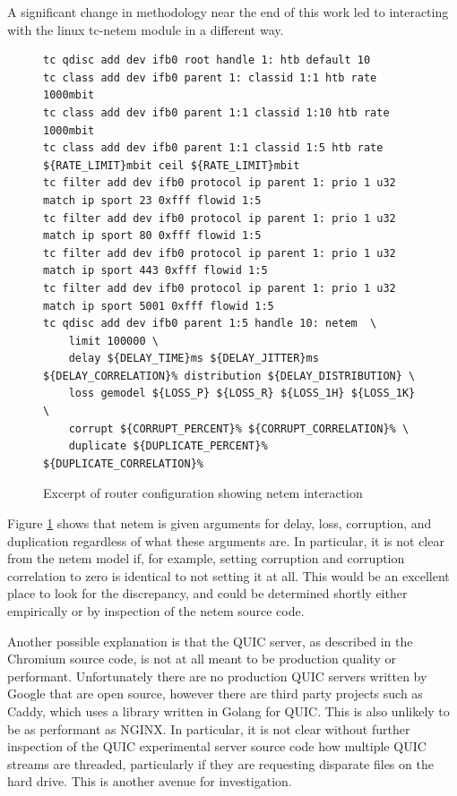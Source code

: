 \documentclass[12pt]{article}
\begin{document}
A significant change in methodology near the end of this work led to interacting with the linux tc-netem module in a different way.

\begin{figure}
\begin{lstlisting}[basicstyle=\tiny]
tc qdisc add dev ifb0 root handle 1: htb default 10
tc class add dev ifb0 parent 1: classid 1:1 htb rate 1000mbit
tc class add dev ifb0 parent 1:1 classid 1:10 htb rate 1000mbit
tc class add dev ifb0 parent 1:1 classid 1:5 htb rate ${RATE_LIMIT}mbit ceil ${RATE_LIMIT}mbit
tc filter add dev ifb0 protocol ip parent 1: prio 1 u32 match ip sport 23 0xfff flowid 1:5
tc filter add dev ifb0 protocol ip parent 1: prio 1 u32 match ip sport 80 0xfff flowid 1:5
tc filter add dev ifb0 protocol ip parent 1: prio 1 u32 match ip sport 443 0xfff flowid 1:5
tc filter add dev ifb0 protocol ip parent 1: prio 1 u32 match ip sport 5001 0xfff flowid 1:5
tc qdisc add dev ifb0 parent 1:5 handle 10: netem  \
	limit 100000 \
	delay ${DELAY_TIME}ms ${DELAY_JITTER}ms ${DELAY_CORRELATION}% distribution ${DELAY_DISTRIBUTION} \
	loss gemodel ${LOSS_P} ${LOSS_R} ${LOSS_1H} ${LOSS_1K} \
	corrupt ${CORRUPT_PERCENT}% ${CORRUPT_CORRELATION}% \
	duplicate ${DUPLICATE_PERCENT}% ${DUPLICATE_CORRELATION}%
\end{lstlisting}
\caption{Excerpt of router configuration showing netem interaction}
\label{figs:netem}
\end{figure}

Figure \ref{figs:netem} shows that netem is given arguments for delay, loss, corruption, and duplication regardless of what these arguments are. In particular, it is not clear from the netem model if, for example, setting corruption and corruption correlation to zero is identical to not setting it at all. This would be an excellent place to look for the discrepancy, and could be determined shortly either empirically or by inspection of the netem source code.

Another possible explanation is that the QUIC server, as described in the Chromium source code, is not at all meant to be production quality or performant. Unfortunately there are no production QUIC servers written by Google that are open source, however there are third party projects such as Caddy, which uses a library written in Golang for QUIC. This is also unlikely to be as performant as NGINX. In particular, it is not clear without further inspection of the QUIC experimental server source code how multiple QUIC streams are threaded, particularly if they are requesting disparate files on the hard drive. This is another avenue for investigation.
\end{document}
